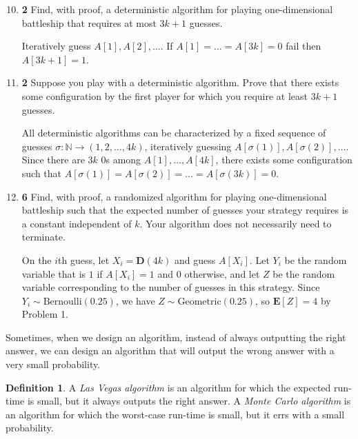 \documentclass[12pt]{article}
\theoremstyle{plain}
\theoremstyle{definition}
\newtheorem{defn}{Definition}[section]
\theoremstyle{remark}
\newcommand{\E}{\textbf{E}}
\newcommand{\pts}[1]{\lbrack\textbf{#1}\rbrack}
\begin{document}
\begin{enumerate}
\setcounter{enumi}{9}

\item \pts{2} Find, with proof, a deterministic algorithm for playing one-dimensional battleship that requires at most $3k+1$ guesses.

\begin{tcolorbox}
Iteratively guess $A[1],A[2],\dots$. If $A[1]=\dots=A[3k]=0$ fail then $A[3k+1]=1$.
\end{tcolorbox}

\item \pts{2} Suppose you play with a deterministic algorithm. Prove that there exists some configuration by the first player for which you require at least $3k+1$ guesses.

\begin{tcolorbox}
All deterministic algorithms can be characterized by a fixed sequence of guesses $\sigma:\mathbb{N}\to(1,2,\dots,4k)$, iteratively guessing $A[\sigma(1)],A[\sigma(2)],\dots$. Since there are $3k$ $0$s among $A[1],\dots,A[4k]$, there exists some configuration such that $A[\sigma(1)]=A[\sigma(2)]=\dots=A[\sigma(3k)]=0$.
\end{tcolorbox}

\item \pts{6} Find, with proof, a randomized algorithm for playing one-dimensional battleship such that the expected number of guesses your strategy requires is a constant independent of $k$. Your algorithm does not necessarily need to terminate.

\begin{tcolorbox}
On the $i$th guess, let $X_i=\textbf{D}(4k)$ and guess $A[X_i]$. Let $Y_i$ be the random variable that is $1$ if $A[X_i]=1$ and $0$ otherwise, and let $Z$ be the random variable corresponding to the number of guesses in this strategy. Since $Y_i\sim\text{Bernoulli}(0.25)$, we have $Z\sim\text{Geometric}(0.25)$, so $\E[Z]=4$ by Problem 1.
\end{tcolorbox}
\end{enumerate}

Sometimes, when we design an algorithm, instead of always outputting the right answer, we can design an algorithm that will output the wrong answer with a very small probability.

\begin{defn}
A \emph{Las Vegas algorithm} is an algorithm for which the expected run-time is small, but it always outputs the right answer. A \emph{Monte Carlo algorithm} is an algorithm for which the worst-case run-time is small, but it errs with a small probability.
\end{defn}
\end{document}
